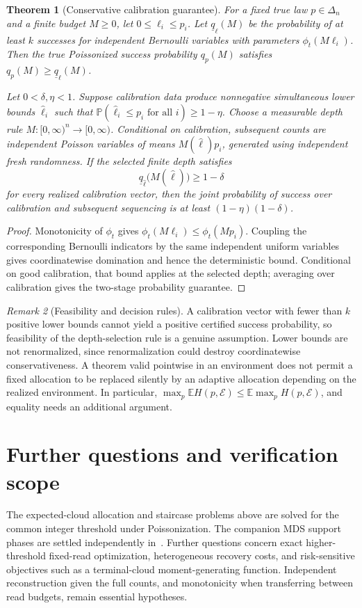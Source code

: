 \documentclass[11pt]{article}
\newtheorem{theorem}{Theorem}[section]
\theoremstyle{definition}
\theoremstyle{remark}
\newtheorem{remark}[theorem]{Remark}
\newcommand{\E}{\mathbb E}
\newcommand{\Pbb}{\mathbb P}
\newcommand{\1}{\mathbf 1}
\begin{document}
\begin{theorem}[Conservative calibration guarantee]\label{thm:plugin}
For a fixed true law \(p\in\Delta_n\) and a finite budget \(M\ge0\),
let \(0\le\ell_i\le p_i\).
Let \(\underline q_\ell(M)\) be the probability of at least \(k\)
successes for independent Bernoulli variables with parameters
\(\phi_t(M\ell_i)\). Then the true Poissonized success probability
\(q_p(M)\) satisfies \(q_p(M)\ge\underline q_\ell(M)\).

Let \(0<\delta,\eta<1\). Suppose calibration data produce
nonnegative simultaneous lower bounds \(\widehat\ell_i\) such that
\(\Pbb(\widehat\ell_i\le p_i\text{ for all }i)\ge1-\eta\).
Choose a measurable depth rule
\(M:[0,\infty)^n\to[0,\infty)\). Conditional on calibration,
subsequent counts are independent Poisson variables of means
\(M(\widehat\ell)p_i\), generated using independent fresh randomness.
If the selected finite depth satisfies
\[
 \underline q_{\widehat\ell}\bigl(M(\widehat\ell)\bigr)\ge1-\delta
\]
for every realized calibration vector, then the joint probability of
success over calibration and subsequent sequencing is at least
\((1-\eta)(1-\delta)\).
\end{theorem}
\begin{proof}
Monotonicity of \(\phi_t\) gives
\(\phi_t(M\ell_i)\le\phi_t(Mp_i)\). Coupling the corresponding
Bernoulli indicators by the same independent uniform variables gives
coordinatewise domination and hence the deterministic bound. Conditional
on good calibration, that bound applies at the selected depth; averaging
over calibration gives the two-stage probability guarantee.
\end{proof}

\begin{remark}[Feasibility and decision rules]
A calibration vector with fewer than \(k\) positive lower bounds cannot
yield a positive certified success probability, so feasibility of the
depth-selection rule is a genuine assumption. Lower bounds are not
renormalized, since renormalization could destroy coordinatewise
conservativeness. A theorem valid pointwise in an environment does not
permit a fixed allocation to be replaced silently by an adaptive
allocation depending on the realized environment. In particular,
\(\max_p\E H(p,\mathcal E)\le\E\max_pH(p,\mathcal E)\), and equality
needs an additional argument.
\end{remark}

\section{Further questions and verification scope}
The expected-cloud allocation and staircase problems above are solved
for the common integer threshold under Poissonization. The companion
MDS support phases are settled independently in~\cite{LongGamma2026}.
Further questions concern exact higher-threshold fixed-read optimization,
heterogeneous recovery costs, and risk-sensitive objectives such as a
terminal-cloud moment-generating function.
Independent reconstruction given the full counts, and monotonicity
when transferring between read budgets, remain essential hypotheses.
\end{document}
